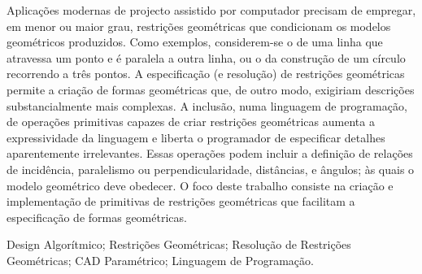 \begin{pt}
\begin{resumo}
Aplicações modernas de projecto assistido por computador precisam de empregar,
em menor ou maior grau, restrições geométricas que condicionam os modelos
geométricos produzidos.  Como exemplos, considerem-se o de uma linha que
atravessa um ponto e é paralela a outra linha, ou o da construção de um círculo
recorrendo a três pontos.  A especificação (e resolução) de restrições
geométricas permite a criação de formas geométricas que, de outro modo,
exigiriam descrições substancialmente mais complexas.  A inclusão, numa
linguagem de programação, de operações primitivas capazes de criar restrições
geométricas aumenta a expressividade da linguagem e liberta o programador de
especificar detalhes aparentemente irrelevantes.  Essas operações podem incluir
a definição de relações de incidência, paralelismo ou perpendicularidade,
distâncias, e ângulos; às quais o modelo geométrico deve obedecer.  O foco deste
trabalho consiste na criação e implementação de primitivas de restrições
geométricas que facilitam a especificação de formas geométricas.
\end{resumo}

\begin{palavraschave}
\noindent
Design Algorítmico;
Restrições Geométricas;
Resolução de Restrições Geométricas;
CAD Paramétrico;
Linguagem de Programação.
\end{palavraschave}
\end{pt}

\clearpage
\thispagestyle{empty}
